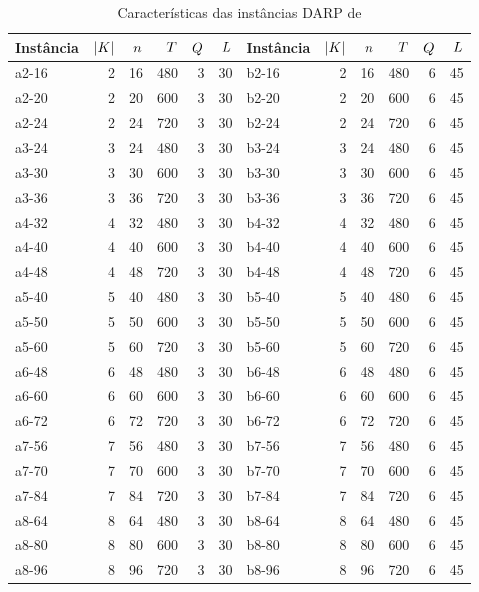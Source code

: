 \documentclass{anpet}
\begin{document}
\begin{table}[H]
    \centering
    \caption{Características das instâncias DARP de \textcite{ropke_models_2007}}
    \label{tab:ropke_models_2007_DARP_instances_caracteristics}
    \begin{tabular}{lrrrrr|lrrrrr}
        \toprule
        Instância & $|K|$ & $n$ & $T$ & $Q$ & $L$ & Instância & $|K|$ & $n$ & $T$ & $Q$ & $L$\\
        \midrule
        a2-16 & 2 & 16 & 480 & 3 & 30 & b2-16 & 2 & 16 & 480 & 6 & 45\\
        a2-20 & 2 & 20 & 600 & 3 & 30 & b2-20 & 2 & 20 & 600 & 6 & 45\\
        a2-24 & 2 & 24 & 720 & 3 & 30 & b2-24 & 2 & 24 & 720 & 6 & 45\\
        a3-24 & 3 & 24 & 480 & 3 & 30 & b3-24 & 3 & 24 & 480 & 6 & 45\\
        a3-30 & 3 & 30 & 600 & 3 & 30 & b3-30 & 3 & 30 & 600 & 6 & 45\\
        a3-36 & 3 & 36 & 720 & 3 & 30 & b3-36 & 3 & 36 & 720 & 6 & 45\\
        a4-32 & 4 & 32 & 480 & 3 & 30 & b4-32 & 4 & 32 & 480 & 6 & 45\\
        a4-40 & 4 & 40 & 600 & 3 & 30 & b4-40 & 4 & 40 & 600 & 6 & 45\\
        a4-48 & 4 & 48 & 720 & 3 & 30 & b4-48 & 4 & 48 & 720 & 6 & 45\\
        a5-40 & 5 & 40 & 480 & 3 & 30 & b5-40 & 5 & 40 & 480 & 6 & 45\\
        a5-50 & 5 & 50 & 600 & 3 & 30 & b5-50 & 5 & 50 & 600 & 6 & 45\\
        a5-60 & 5 & 60 & 720 & 3 & 30 & b5-60 & 5 & 60 & 720 & 6 & 45\\
        a6-48 & 6 & 48 & 480 & 3 & 30 & b6-48 & 6 & 48 & 480 & 6 & 45\\
        a6-60 & 6 & 60 & 600 & 3 & 30 & b6-60 & 6 & 60 & 600 & 6 & 45\\
        a6-72 & 6 & 72 & 720 & 3 & 30 & b6-72 & 6 & 72 & 720 & 6 & 45\\
        a7-56 & 7 & 56 & 480 & 3 & 30 & b7-56 & 7 & 56 & 480 & 6 & 45\\
        a7-70 & 7 & 70 & 600 & 3 & 30 & b7-70 & 7 & 70 & 600 & 6 & 45\\
        a7-84 & 7 & 84 & 720 & 3 & 30 & b7-84 & 7 & 84 & 720 & 6 & 45\\
        a8-64 & 8 & 64 & 480 & 3 & 30 & b8-64 & 8 & 64 & 480 & 6 & 45\\
        a8-80 & 8 & 80 & 600 & 3 & 30 & b8-80 & 8 & 80 & 600 & 6 & 45\\
        a8-96 & 8 & 96 & 720 & 3 & 30 & b8-96 & 8 & 96 & 720 & 6 & 45\\
        \bottomrule
    \end{tabular}
\end{table}
\end{document}
